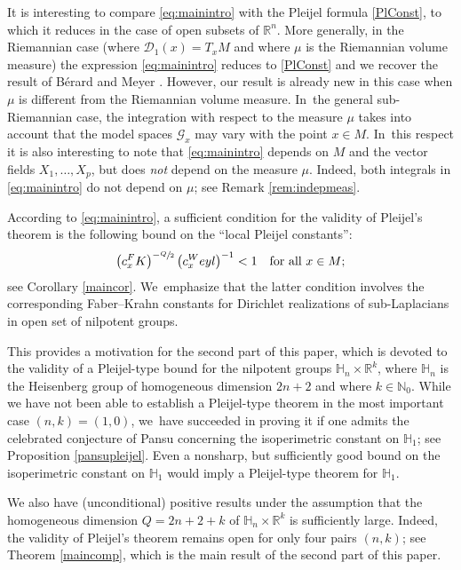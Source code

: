 \documentclass[11pt]{article}
\let\oldsfrac\sfrac
\renewcommand{\sfrac}[2]{{\oldsfrac{#1}{#2}}}
\newcommand{\FK}{\textup{FK}}
\newcommand{\Weyl}{\textup{Weyl}}
\theoremstyle{definition}
\newcommand{\1}{\mathbbm{1}}
\newcommand{\N}{\mathbb{N}}
\newcommand{\R}{\mathbb{R}}
\numberwithin{equation}{section}
\begin{document}
It is interesting to compare \eqref{eq:mainintro} with the Pleijel formula \eqref{PlConst}, to which it reduces in the case of open subsets of $\R^n$. More generally, in the Riemannian case (where $\mathcal D_1(x) = T_x M$ and where $\mu$ is the Riemannian volume measure) the expression \eqref{eq:mainintro} reduces to \eqref{PlConst} and we recover the result of Bérard and Meyer \cite{BerMe}. However, our result is already new in this case when $\mu$ is different from the Riemannian volume measure. In~the general sub-Riemannian case, the integration with respect to the measure $\mu$ takes into account that the model spaces $\mathcal G_x$ may vary with the point $x\in M$. In~this respect it is also interesting to note that \eqref{eq:mainintro} depends on $M$ and the vector fields $X_1,\ldots,X_p$, but does \emph{not} depend on the measure $\mu$. Indeed, both integrals in \eqref{eq:mainintro} do not depend on $\mu$; see Remark \ref{rem:indepmeas}.

According to \eqref{eq:mainintro}, a sufficient condition for the validity of Pleijel's theorem is the following bound on the ``local Pleijel constants'':
\[
\bigl(c_x^\FK \bigr)^{-\sfrac Q2} \,\bigl(c_x^\Weyl \bigr)^{-1} < 1
\quad\text{for all}\ x\in M ;
\]
see Corollary \ref{maincor}. We~emphasize that the latter condition involves the corresponding Faber--Krahn constants for Dirichlet realizations of sub-Laplacians in open set of nilpotent groups.

This provides a motivation for the second part of this paper, which is devoted to the validity of a Pleijel-type bound for the nilpotent groups $\mathbb H_n \times \mathbb R^k$, where $\mathbb H_n $ is the Heisenberg group of homogeneous dimension $2n+2$ and where $k\in\N_0$. While we have not been able to establish a Pleijel-type theorem in the most important case $(n,k)=(1,0)$, we~have succeeded in proving it if one admits the celebrated conjecture of Pansu concerning the isoperimetric constant on $\mathbb H_1$; see Proposition \ref{pansupleijel}. Even a nonsharp, but sufficiently good bound on the isoperimetric constant on $\mathbb H_1$ would imply a Pleijel-type theorem for $\mathbb H_1$.

We also have (unconditional) positive results under the assumption that the homogeneous dimension $Q=2n+2+k$ of $\mathbb H_n\times\R^k$ is sufficiently large. Indeed, the validity of Pleijel's theorem remains open for only four pairs $(n,k)$; see Theorem \ref{maincomp}, which is the main result of the second part of this paper.
\end{document}
